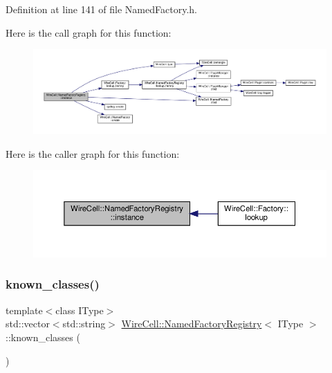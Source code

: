 Definition at line 141 of file Named\+Factory.\+h.

Here is the call graph for this function\+:
\nopagebreak
\begin{figure}[H]
\begin{center}
\leavevmode
\includegraphics[width=350pt]{class_wire_cell_1_1_named_factory_registry_a81b540cbf24b04c728ad24a7e0af6c2e_cgraph}
\end{center}
\end{figure}
Here is the caller graph for this function\+:
\nopagebreak
\begin{figure}[H]
\begin{center}
\leavevmode
\includegraphics[width=350pt]{class_wire_cell_1_1_named_factory_registry_a81b540cbf24b04c728ad24a7e0af6c2e_icgraph}
\end{center}
\end{figure}
\mbox{\label{class_wire_cell_1_1_named_factory_registry_ab463521dc3c31192252a4ba154c1d967}} 
\subsubsection{\texorpdfstring{known\+\_\+classes()}{known\_classes()}}
{\footnotesize\ttfamily template$<$class I\+Type$>$ \\
std\+::vector$<$std\+::string$>$ \hyperlink{class_wire_cell_1_1_named_factory_registry}{Wire\+Cell\+::\+Named\+Factory\+Registry}$<$ I\+Type $>$\+::known\+\_\+classes (\begin{DoxyParamCaption}{ }\end{DoxyParamCaption})\hspace{0.3cm}{\ttfamily [inline]}}

